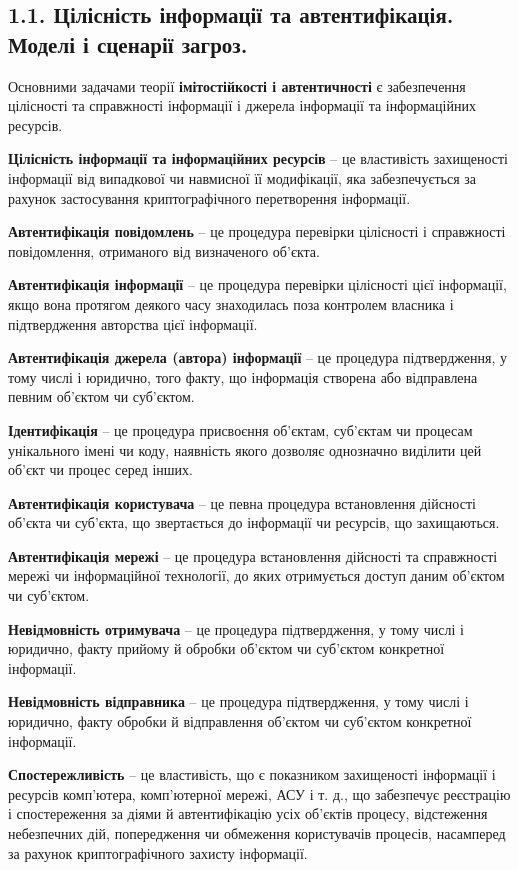 \subsection{1.1. Цілісність інформації та автентифікація. Моделі і сценарії загроз.}

Основними задачами теорії \textbf{імітостійкості і автентичності} є
забезпечення цілісності та справжності інформації і джерела інформації та
інформаційних ресурсів.

\textbf{Цілісність інформації та інформаційних ресурсів} -- це властивість
захищеності інформації від випадкової чи навмисної її модифікації, яка
забезпечується за рахунок застосування криптографічного перетворення
інформації.

\textbf{Автентифікація повідомлень} -- це процедура перевірки цілісності і
справжності повідомлення, отриманого від визначеного об'єкта.

\textbf{Автентифікація інформації} -- це процедура перевірки цілісності цієї інформації,
якщо вона протягом деякого часу знаходилась поза контролем власника і підтвердження авторства цієї інформації.

\textbf{Автентифікація джерела (автора) інформації} -- це процедура
підтвердження, у тому числі і юридично, того факту, що інформація створена
або відправлена певним об'єктом чи суб'єктом.

\textbf{Ідентифікація} -- це процедура присвоєння об'єктам, суб'єктам чи
процесам унікального імені чи коду, наявність якого дозволяє однозначно
виділити цей об'єкт чи процес серед інших.

\textbf{Автентифікація користувача} -- це певна процедура встановлення дійсності об'єкта чи
суб'єкта, що звертається до інформації чи ресурсів, що захищаються.

\textbf{Автентифікація мережі} -- це процедура встановлення дійсності та
справжності мережі чи інформаційної технології, до яких отримується доступ
даним об'єктом чи суб'єктом.

\textbf{Невідмовність отримувача} -- це процедура підтвердження, у тому числі і
юридично, факту прийому й обробки об'єктом чи суб'єктом конкретної
інформації.

\textbf{Невідмовність відправника} -- це процедура підтвердження, у тому числі і
юридично, факту обробки й відправлення об'єктом чи суб'єктом конкретної
інформації.

\textbf{Спостережливість} -- це властивість, що є показником захищеності інформації і ресурсів
комп’ютера, комп'ютерної мережі, АСУ і т. д., що забезпечує реєстрацію і
спостереження за діями й автентифікацію усіх об'єктів процесу, відстеження
небезпечних дій, попередження чи обмеження користувачів процесів,
насамперед за рахунок криптографічного захисту інформації.

